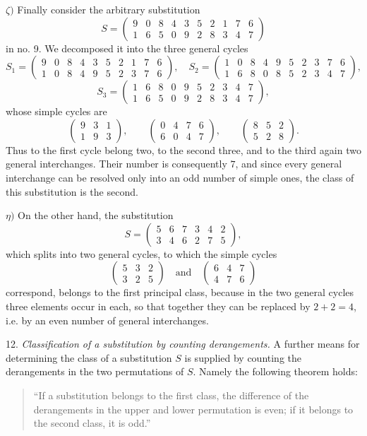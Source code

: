\documentclass[10pt]{article}
\begin{document}
\(\zeta)\) Finally consider the arbitrary substitution
\[
S=\begin{pmatrix}9&0&8&4&3&5&2&1&7&6\\1&6&5&0&9&2&8&3&4&7\end{pmatrix}
\]
in no. 9. We decomposed it into the three general cycles
\[
S_1=\begin{pmatrix}9&0&8&4&3&5&2&1&7&6\\1&0&8&4&9&5&2&3&7&6\end{pmatrix},
\quad
S_2=\begin{pmatrix}1&0&8&4&9&5&2&3&7&6\\1&6&8&0&8&5&2&3&4&7\end{pmatrix},
\]
\[
S_3=\begin{pmatrix}1&6&8&0&9&5&2&3&4&7\\1&6&5&0&9&2&8&3&4&7\end{pmatrix},
\]
whose simple cycles are
\[
\begin{pmatrix}9&3&1\\1&9&3\end{pmatrix},\qquad
\begin{pmatrix}0&4&7&6\\6&0&4&7\end{pmatrix},\qquad
\begin{pmatrix}8&5&2\\5&2&8\end{pmatrix}.
\]
Thus to the first cycle belong two, to the second three, and to the third again two general interchanges. Their number is consequently \(7\), and since every general interchange can be resolved only into an odd number of simple ones, the class of this substitution is the second.

\(\eta)\) On the other hand, the substitution
\[
S=\begin{pmatrix}5&6&7&3&4&2\\3&4&6&2&7&5\end{pmatrix},
\]
which splits into two general cycles, to which the simple cycles
\[
\begin{pmatrix}5&3&2\\3&2&5\end{pmatrix}
\quad\text{and}\quad
\begin{pmatrix}6&4&7\\4&7&6\end{pmatrix}
\]
correspond, belongs to the first principal class, because in the two general cycles three elements occur in each, so that together they can be replaced by \(2+2=4\), i.e. by an even number of general interchanges.

12. \emph{Classification of a substitution by counting derangements.} A further means for determining the class of a substitution \(S\) is supplied by counting the derangements in the two permutations of \(S\). Namely the following theorem holds:
\begin{quote}
``If a substitution belongs to the first class, the difference of the derangements in the upper and lower permutation is even; if it belongs to the second class, it is odd.''
\end{quote}
\end{document}

